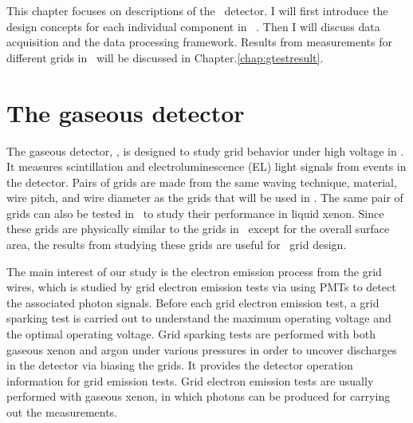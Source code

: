 

This chapter focuses on descriptions of the  \gtest\ detector. I will first introduce the design concepts for each individual component in \gtest\ . Then I will discuss data acquisition and the data processing framework.  Results from measurements for different grids in \gtest\ will be discussed in Chapter.\ref{chap:gtestresult}.

\section{The gaseous detector}
\label{sec:gtest dectector}
The gaseous detector, \gtest , is designed to study grid behavior under high voltage in \lze . It measures scintillation and electroluminescence (EL) light signals from events in the detector. Pairs of grids are made from the same waving technique, material, wire pitch, and wire diameter as the grids that will be used in \lze . %
The same pair of grids can also be tested in \phaseone\ to study their performance in liquid xenon. Since these grids are physically similar to the grids in \lze\ except for the overall surface area, the results from studying these grids are useful for \lze\ grid design. 

The main interest of our study is the electron emission process from the grid wires, which is studied by grid electron emission tests via using PMTs to detect the associated photon signals. Before each grid electron emission test, a grid sparking test is carried out to understand the maximum operating voltage and the optimal operating voltage. Grid sparking tests are performed with both gaseous xenon and argon under various pressures in order to uncover discharges in the detector via biasing the grids. It provides the detector operation information for grid emission tests. Grid electron emission tests are usually performed with gaseous xenon, in which photons can be produced for carrying out the \ees measurements. %

